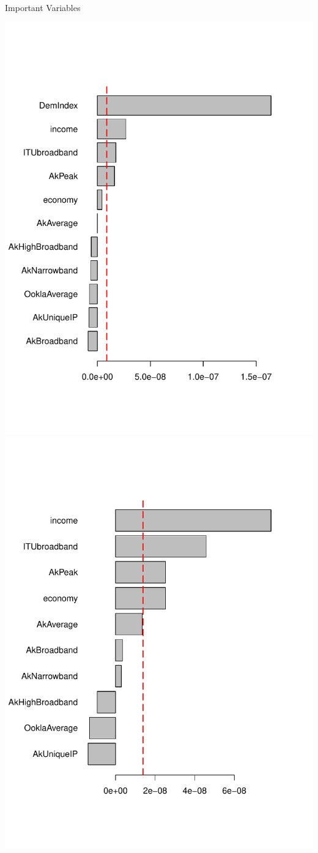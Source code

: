 \documentclass{beamer}
\begin{document}
\begin{frame}{Important Variables}
	\begin{center}
		\includegraphics[width=.5\textwidth]{ImportantVariables-caret.pdf}
		\includegraphics[width=.5\textwidth]{ImportantVariables-NoDemIndex.pdf}
	\end{center}
\end{frame}
\end{document}
